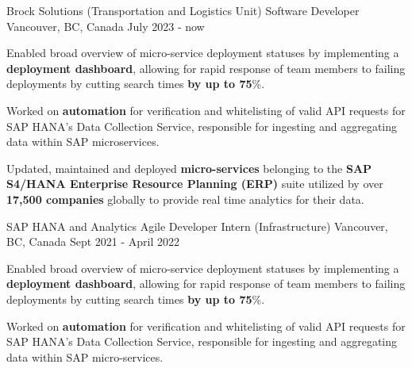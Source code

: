 

\begin{cventries}
 \cventry
    {Brock Solutions (Transportation and Logistics Unit)} %
    {Software Developer} %
    {Vancouver, BC, Canada} %
    {July 2023 - now} %
{
      \begin{cvitems} %
      \item {Enabled broad overview of micro-service deployment statuses by implementing a \textbf{deployment dashboard}, allowing for rapid response of team members to failing deployments by cutting search times\textbf{ by up to 75}\%.}
      \item {Worked on \textbf{automation} for verification and whitelisting of valid API requests for SAP HANA's Data Collection Service, responsible for ingesting and aggregating data within SAP microservices.}
       \item {Updated, maintained and deployed \textbf{micro-services} belonging to the \textbf{SAP S4/HANA Enterprise Resource Planning (ERP)} suite utilized by over \textbf{17,500 companies} globally to provide real time analytics for their data.}
      \end{cvitems}
    }      
 \cventry
    {SAP HANA and Analytics} %
    {Agile Developer Intern (Infrastructure)} %
    {Vancouver, BC, Canada} %
    {Sept 2021 - April 2022} %
    {
      \begin{cvitems} %
      \item {Enabled broad overview of micro-service deployment statuses by implementing a \textbf{deployment dashboard}, allowing for rapid response of team members to failing deployments by cutting search times\textbf{ by up to 75}\%.}
      \item {Worked on \textbf{automation} for verification and whitelisting of valid API requests for SAP HANA's Data Collection Service, responsible for ingesting and aggregating data within SAP micro-services.}

\end{cvitems}}
\end{cventries}

